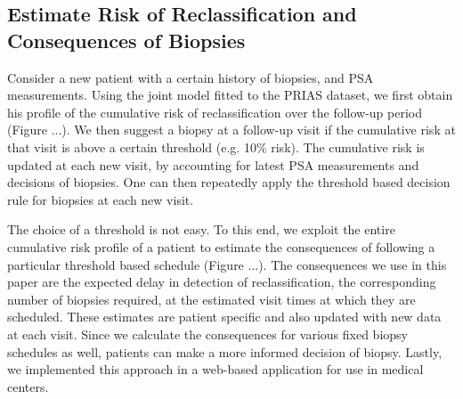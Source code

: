 \subsection{Estimate Risk of Reclassification and Consequences of Biopsies}
Consider a new patient with a certain history of biopsies, and PSA measurements. Using the joint model fitted to the PRIAS dataset, we first obtain his profile of the cumulative risk of reclassification over the follow-up period (Figure ...). We then suggest a biopsy at a follow-up visit if the cumulative risk at that visit is above a certain threshold (e.g. 10\% risk). The cumulative risk is updated at each new visit, by accounting for latest PSA measurements and decisions of biopsies. One can then repeatedly apply the threshold based decision rule for biopsies at each new visit. 

The choice of a threshold is not easy. To this end, we exploit the entire cumulative risk profile of a patient to estimate the consequences of following a particular threshold based schedule (Figure ...). The consequences we use in this paper are the expected delay in detection of reclassification, the corresponding number of biopsies required, at the estimated visit times at which they are scheduled. These estimates are patient specific and also updated with new data at each visit. Since we calculate the consequences for various fixed biopsy schedules as well, patients can make a more informed decision of biopsy. Lastly, we implemented this approach in a web-based application for use in medical centers.